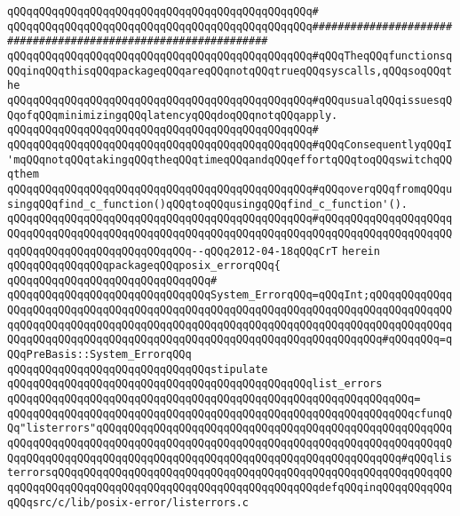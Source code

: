 \verb|qQQqqQQqqQQqqQQqqQQqqQQqqQQqqQQqqQQqqQQqqQQqqQQq#|\newline
\verb|qQQqqQQqqQQqqQQqqQQqqQQqqQQqqQQqqQQqqQQqqQQqqQQq###############################################################|\newline
\verb|qQQqqQQqqQQqqQQqqQQqqQQqqQQqqQQqqQQqqQQqqQQqqQQq#qQQqTheqQQqfunctionsqQQqinqQQqthisqQQqpackageqQQqareqQQqnotqQQqtrueqQQqsyscalls,qQQqsoqQQqthe|\newline
\verb|qQQqqQQqqQQqqQQqqQQqqQQqqQQqqQQqqQQqqQQqqQQqqQQq#qQQqusualqQQqissuesqQQqofqQQqminimizingqQQqlatencyqQQqdoqQQqnotqQQqapply.|\newline
\verb|qQQqqQQqqQQqqQQqqQQqqQQqqQQqqQQqqQQqqQQqqQQqqQQq#|\newline
\verb|qQQqqQQqqQQqqQQqqQQqqQQqqQQqqQQqqQQqqQQqqQQqqQQq#qQQqConsequentlyqQQqI'mqQQqnotqQQqtakingqQQqtheqQQqtimeqQQqandqQQqeffortqQQqtoqQQqswitchqQQqthem|\newline
\verb|qQQqqQQqqQQqqQQqqQQqqQQqqQQqqQQqqQQqqQQqqQQqqQQq#qQQqoverqQQqfromqQQqusingqQQqfind_c_function()qQQqtoqQQqusingqQQqfind_c_function'().|\newline
\verb|qQQqqQQqqQQqqQQqqQQqqQQqqQQqqQQqqQQqqQQqqQQqqQQq#qQQqqQQqqQQqqQQqqQQqqQQqqQQqqQQqqQQqqQQqqQQqqQQqqQQqqQQqqQQqqQQqqQQqqQQqqQQqqQQqqQQqqQQqqQQqqQQqqQQqqQQqqQQqqQQqqQQqqQQq--qQQq2012-04-18qQQqCrT|\newline
\verb|herein|\newline
\newline
\verb|qQQqqQQqqQQqqQQqpackageqQQqposix_errorqQQq{|\newline
\verb|qQQqqQQqqQQqqQQqqQQqqQQqqQQqqQQq#|\newline
\verb|qQQqqQQqqQQqqQQqqQQqqQQqqQQqqQQqSystem_ErrorqQQq=qQQqInt;qQQqqQQqqQQqqQQqqQQqqQQqqQQqqQQqqQQqqQQqqQQqqQQqqQQqqQQqqQQqqQQqqQQqqQQqqQQqqQQqqQQqqQQqqQQqqQQqqQQqqQQqqQQqqQQqqQQqqQQqqQQqqQQqqQQqqQQqqQQqqQQqqQQqqQQqqQQqqQQqqQQqqQQqqQQqqQQqqQQqqQQqqQQqqQQqqQQqqQQqqQQqqQQqqQQq#qQQqqQQq=qQQqPreBasis::System_ErrorqQQq|\newline
\newline
\newline
\verb|qQQqqQQqqQQqqQQqqQQqqQQqqQQqqQQqstipulate|\newline
\verb|qQQqqQQqqQQqqQQqqQQqqQQqqQQqqQQqqQQqqQQqqQQqqQQqlist_errors|\newline
\verb|qQQqqQQqqQQqqQQqqQQqqQQqqQQqqQQqqQQqqQQqqQQqqQQqqQQqqQQqqQQqqQQq=|\newline
\verb|qQQqqQQqqQQqqQQqqQQqqQQqqQQqqQQqqQQqqQQqqQQqqQQqqQQqqQQqqQQqqQQqcfunqQQq"listerrors"qQQqqQQqqQQqqQQqqQQqqQQqqQQqqQQqqQQqqQQqqQQqqQQqqQQqqQQqqQQqqQQqqQQqqQQqqQQqqQQqqQQqqQQqqQQqqQQqqQQqqQQqqQQqqQQqqQQqqQQqqQQqqQQqqQQqqQQqqQQqqQQqqQQqqQQqqQQqqQQqqQQqqQQqqQQqqQQqqQQqqQQqqQQq#qQQqlisterrorsqQQqqQQqqQQqqQQqqQQqqQQqqQQqqQQqqQQqqQQqqQQqqQQqqQQqqQQqqQQqqQQqqQQqqQQqqQQqqQQqqQQqqQQqqQQqqQQqqQQqqQQqqQQqqQQqdefqQQqinqQQqqQQqqQQqqQQqsrc/c/lib/posix-error/listerrors.c|\newline
